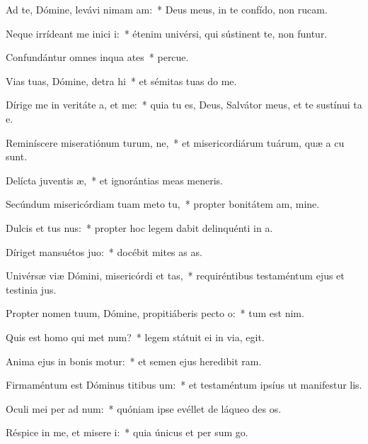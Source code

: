 \item Ad te, Dómine, levávi nimam am:~* Deus meus, in te confído, non rucam.
\item Neque irrídeant me inici i:~* étenim univérsi, qui sústinent te, non funtur.
\item Confundántur omnes inqua ates~* percue.
\item Vias tuas, Dómine, detra hi~* et sémitas tuas do me.
\item Dírige me in veritáte a, et  me:~* quia tu es, Deus, Salvátor meus, et te sustínui ta e.
\item Reminíscere miseratiónum turum, ne,~* et misericordiárum tuárum, quæ a cu sunt.
\item Delícta juventis æ,~* et ignorántias meas  meneris.
\item Secúndum misericórdiam tuam meto  tu,~* propter bonitátem am, mine.
\item Dulcis et tus nus:~* propter hoc legem dabit delinquénti in a.
\item Díriget mansuétos  juo:~* docébit mites as as.
\item Univérsæ viæ Dómini, misericórdi et tas,~* requiréntibus testaméntum ejus et testinia jus.
\item Propter nomen tuum, Dómine, propitiáberis pecto o:~* tum est nim.
\item Quis est homo qui met num?~* legem státuit ei in via,  egit.
\item Anima ejus in bonis motur:~* et semen ejus heredibit ram.
\item Firmaméntum est Dóminus titibus um:~* et testaméntum ipsíus ut manifestur lis.
\item Oculi mei per ad num:~* quóniam ipse evéllet de láqueo des os.
\item Réspice in me, et misere i:~* quia únicus et per sum go.
